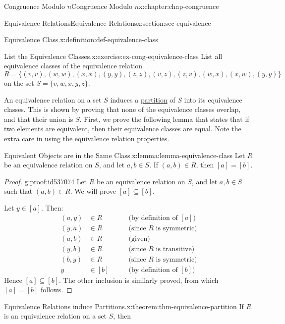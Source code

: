 \documentclass[oneside,10pt,]{book}
\numberwithin{equation}{section}
\newcommand{\amp}{&}
\begin{document}
\begin{chapterptx}{Congruence Modulo \(n\)}{}{Congruence Modulo \(n\)}{}{}{x:chapter:chap-congruence}
\begin{sectionptx}{Equivalence Relations}{}{Equivalence Relations}{}{}{x:section:sec-equivalence}
\begin{definition}{Equivalence Class.}{x:definition:def-equivalence-class}
%
\end{definition}
\begin{inlineexercise}{List the Equivalence Classes.}{x:exercise:ex-cong-equivalence-class}%
List all equivalence classes of the equivalence relation%
\begin{equation*}
R = \{(v,v),(w,w),(x,x),(y,y),(z,z),(v,z),(z,v),(w,x),(x,w),(y,y)\}
\end{equation*}
on the set \(S = \{v,w,x,y,z\}\).%
\end{inlineexercise}%
An equivalence relation on a set \(S\) induces a \hyperref[x:definition:def-partition]{partition} of \(S\) into its equivalence classes. This is shown by proving that none of the equivalence classes overlap, and that their union is \(S\). First, we prove the following lemma that states that if two elements are equivalent, then their equivalence classes are equal. Note the extra care in using the equivalence relation properties.%
\begin{lemma}{Equivalent Objects are in the Same Class.}{}{x:lemma:lemma-equivalence-class}%
Let \(R\) be an equivalence relation on \(S\), and let \(a, b \in S\). If \((a,b) \in R\), then \([a] = [b]\).%
\end{lemma}
\begin{proof}{}{g:proof:id537074}
Let \(R\) be an equivalence relation on \(S\), and let \(a, b \in S\) such that \((a,b) \in R\). We will prove \([a] \subseteq [b]\).%
\par
Let \(y \in [a]\). Then:%
\begin{align*}
(a,y) \amp \in R \qquad \amp \text{(by definition of $[a]$)}\\
(y,a) \amp \in R \qquad \amp \text{(since $R$ is symmetric)}\\
(a,b) \amp \in R \qquad \amp \text{(given)}\\
(y,b) \amp \in R \qquad \amp \text{(since $R$ is transitive)}\\
(b,y) \amp \in R \qquad \amp \text{(since $R$ is symmetric)}\\
y \amp \in [b] \qquad \amp \text{(by definition of $[b]$)}
\end{align*}
Hence \([a] \subseteq [b]\). The other inclusion is similarly proved, from which \([a] = [b]\) follows.%
\end{proof}
\begin{theorem}{Equivalence Relations induce Partitions.}{}{x:theorem:thm-equivalence-partition}%
If \(R\) is an equivalence relation on a set \(S\), then%
\begin{enumerate}[label=(\alph*)]

\end{enumerate}
\end{theorem}
\end{sectionptx}
\end{chapterptx}
\end{document}
